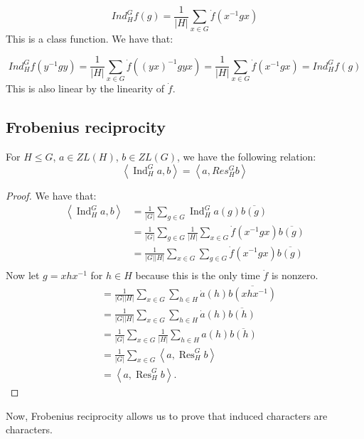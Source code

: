 \documentclass[]{report}
\theoremstyle{definition}
\numberwithin{theorem}{section}
\numberwithin{equation}{section}
\newcommand{\res}{\operatorname{Res}}
\newcommand{\ind}{\operatorname{Ind}}
\begin{document}
\begin{equation}
	Ind^G_H f(g) = \frac{1}{|H|} \sum_{x \in G} \dot{f}(x^{-1} g x)
\end{equation}
This is a class function. We have that:

\begin{equation}
	Ind^G_H f(y^{-1}g y) = \frac{1}{|H|} \sum_{x \in G} \dot{f}((yx)^{-1} g yx) = \frac{1}{|H|} \sum_{x \in G} \dot{f}(x^{-1} g x) = Ind^G_H f(g) 
\end{equation}
This is also linear by the linearity of $\dot{f}$. 

\subsection{Frobenius reciprocity}
For $H \leq G$, $a \in ZL(H)$, $b \in ZL(G)$, we have the following relation:
\begin{equation}
	\left\langle \ind^G_H a ,b \right\rangle = \left\langle a , Res^G_H b \right\rangle 
\end{equation}

\begin{proof}
	We have that:
	\begin{align*}
		\left\langle \ind^G_H a ,b \right\rangle &= 
		\frac{1}{|G|} \sum_{g \in G} \ind^G_H a(g) \overline{b(g)}\\
		&= \frac{1}{|G|} \sum_{g \in G} \frac{1}{|H|} \sum_{x \in G} \dot{f}(x^{-1} g x) \overline{b(g)}\\
		&= \frac{1}{|G||H|}\sum_{x \in G}\sum_{g \in G}   \dot{f}(x^{-1} g x) \overline{b(g)}\\
	\end{align*}
	Now let $g = x h x^{-1}$ for $h \in H$ because this is the only time $\dot{f}$ is nonzero.  
	\begin{align*}
		&= \frac{1}{|G||H|}\sum_{x \in G}\sum_{h \in H}   \dot{a}(h) \overline{b(x h x^{-1})}\\
		&= \frac{1}{|G||H|}\sum_{x \in G}\sum_{h \in H}   \dot{a}(h) \overline{b(h)}\\
		&= \frac{1}{|G|}\sum_{x \in G} \frac{1}{|H|}\sum_{h \in H}   a(h) \overline{b(h)}\\
		&= \frac{1}{|G|}\sum_{x \in G} \left\langle a, \res^G_H b \right\rangle\\
		&= \left\langle a, \res^G_H b \right\rangle.
	\end{align*}
\end{proof}
Now, Frobenius reciprocity allows us to prove that induced characters are characters. 
\end{document}
